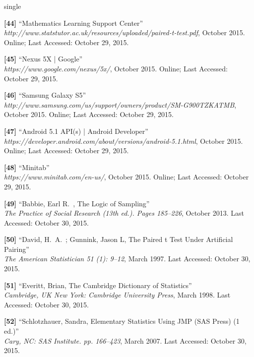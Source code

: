 \documentclass[12pt]{uthesis-v12}  %
\begin{document}
\begin{referencelist}{single}
	\item \textbf{[44]} ``Mathematics Learning Support Center''
	\\\emph{http://www.statstutor.ac.uk/resources/uploaded/paired-t-test.pdf}, October 2015. 
	Online; Last Accessed: October 29, 2015.

	\item \textbf{[45]} ``Nexus 5X | Google''
	\\\emph{https://www.google.com/nexus/5x/}, October 2015. 
	Online; Last Accessed: October 29, 2015.

	\item \textbf{[46]} ``Samsung Galaxy S5''
	\\\emph{http://www.samsung.com/us/support/owners/product/SM-G900TZKATMB}, October 2015. 
	Online; Last Accessed: October 29, 2015.
																		
	\item \textbf{[47]} ``Android 5.1 API(s) | Android Developer''
	\\\emph{https://developer.android.com/about/versions/android-5.1.html}, October 2015. 
	Online; Last Accessed: October 29, 2015.	

	\item \textbf{[48]} ``Minitab''
	\\\emph{https://www.minitab.com/en-us/}, October 2015. 
	Online; Last Accessed: October 29, 2015.				

	\item \textbf{[49]} ``Babbie, Earl R.~, The Logic of Sampling''
	\\\emph{The Practice of Social Research (13th ed.). Pages 185–226}, October 2013.  Last Accessed: October 30, 2015.	
							
	\item \textbf{[50]} ``David, H.~A.~; Gunnink, Jason L, The Paired t Test Under Artificial Pairing''
	\\\emph{The American Statistician 51 (1): 9–12}, March 1997. Last Accessed: October 30, 2015.
	
	\item \textbf{[51]} ``Everitt, Brian, The Cambridge Dictionary of Statistics''
	\\\emph{Cambridge, UK New York: Cambridge University Press}, March 1998. Last Accessed: October 30, 2015.

	\item \textbf{[52]} ``Schlotzhauer, Sandra, Elementary Statistics Using JMP (SAS Press) (1 ed.)''
	\\\emph{Cary, NC: SAS Institute. pp. 166–423}, March 2007. Last Accessed: October 30, 2015.


\end{referencelist}
\end{document}
